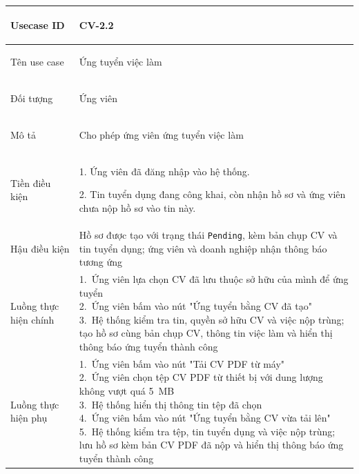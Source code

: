 \begin{table}[H]
    \centering
    \small
    \renewcommand{\arraystretch}{1.0}
    \begin{tabularx}{\textwidth}{|
        >{\bfseries\raggedright\arraybackslash}p{3.2cm}|Y|}
        \hline

        Usecase ID& CV-2.2 \\ \hline

        Tên use case & Ứng tuyển việc làm\\ \hline

        Đối tượng & Ứng viên \\ \hline

        Mô tả & Cho phép ứng viên ứng tuyển việc làm\\ \hline

        Tiền điều kiện &
        \parbox[t]{\hsize}{
            1. Ứng viên đã đăng nhập vào hệ thống.\par
            2. Tin tuyển dụng đang công khai, còn nhận hồ sơ và ứng viên chưa nộp hồ sơ vào tin này.\par
        } \\
        \hline

        Hậu điều kiện & Hồ sơ được tạo với trạng thái \texttt{Pending}, kèm bản chụp CV và tin tuyển dụng; ứng viên và doanh nghiệp nhận thông báo tương ứng \\ \hline

        Luồng thực hiện chính&
        \parbox[t]{\hsize}{
            1.\ Ứng viên lựa chọn CV đã lưu thuộc sở hữu của mình để ứng tuyển\\
            2.\ Ứng viên bấm vào nút "Ứng tuyển bằng CV đã tạo" \\
            3.\ Hệ thống kiểm tra tin, quyền sở hữu CV và việc nộp trùng; tạo hồ sơ cùng bản chụp CV, thông tin việc làm và hiển thị thông báo ứng tuyển thành công
        }\\
        \hline

        Luồng thực hiện phụ&
        \parbox[t]{\hsize}{
            1.\ Ứng viên bấm vào nút "Tải CV PDF từ máy"\\
            2.\ Ứng viên chọn tệp CV PDF từ thiết bị với dung lượng không vượt quá 5~MB\\
            3.\ Hệ thống hiển thị thông tin tệp đã chọn\\
            4.\ Ứng viên bấm vào nút "Ứng tuyển bằng CV vừa tải lên"\\
            5.\ Hệ thống kiểm tra tệp, tin tuyển dụng và việc nộp trùng; lưu hồ sơ kèm bản CV PDF đã nộp và hiển thị thông báo ứng tuyển thành công
        }\\
        \hline
        


\end{tabularx}
\end{table}
